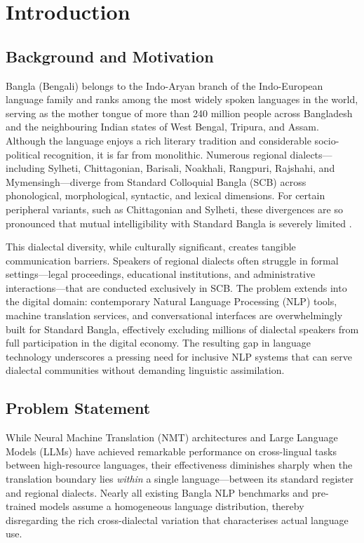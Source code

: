 \documentclass[12pt,a4paper]{article}
\begin{document}
\newpage
\tableofcontents
\newpage

\section{Introduction}

\subsection{Background and Motivation}
Bangla (Bengali) belongs to the Indo-Aryan branch of the Indo-European language family and ranks among the most widely spoken languages in the world, serving as the mother tongue of more than 240 million people across Bangladesh and the neighbouring Indian states of West Bengal, Tripura, and Assam. Although the language enjoys a rich literary tradition and considerable socio-political recognition, it is far from monolithic. Numerous regional dialects---including Sylheti, Chittagonian, Barisali, Noakhali, Rangpuri, Rajshahi, and Mymensingh---diverge from Standard Colloquial Bangla (SCB) across phonological, morphological, syntactic, and lexical dimensions. For certain peripheral variants, such as Chittagonian and Sylheti, these divergences are so pronounced that mutual intelligibility with Standard Bangla is severely limited \cite{faria2025vashantor}.

This dialectal diversity, while culturally significant, creates tangible communication barriers. Speakers of regional dialects often struggle in formal settings---legal proceedings, educational institutions, and administrative interactions---that are conducted exclusively in SCB. The problem extends into the digital domain: contemporary Natural Language Processing (NLP) tools, machine translation services, and conversational interfaces are overwhelmingly built for Standard Bangla, effectively excluding millions of dialectal speakers from full participation in the digital economy. The resulting gap in language technology underscores a pressing need for inclusive NLP systems that can serve dialectal communities without demanding linguistic assimilation.

\subsection{Problem Statement}
While Neural Machine Translation (NMT) architectures and Large Language Models (LLMs) have achieved remarkable performance on cross-lingual tasks between high-resource languages, their effectiveness diminishes sharply when the translation boundary lies \textit{within} a single language---between its standard register and regional dialects. Nearly all existing Bangla NLP benchmarks and pre-trained models assume a homogeneous language distribution, thereby disregarding the rich cross-dialectal variation that characterises actual language use.
\end{document}
